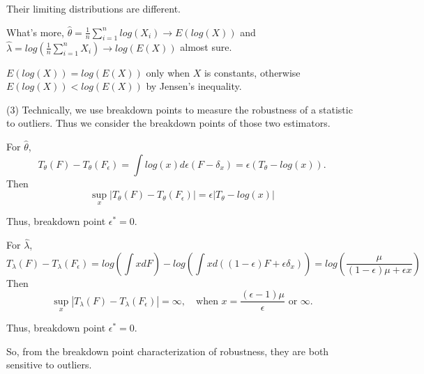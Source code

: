 \begin{solution}
    Their limiting distributions are different.

    What's more, $\hat{\theta}=\frac{1}{n} \sum_{i=1}^n log(X_i) \to E(log(X))$ and $\hat{\lambda} = log\left( \frac{1}{n} \sum_{i=1}^n X_i\right) \to log(E(X))$ almost sure.

    $E(log(X)) = log(E(X))$ only when $X$ is constants, otherwise $E(log(X)) < log(E(X))$ by Jensen's inequality.

    (3) Technically, we use breakdown points to measure the robustness of a statistic to outliers. Thus we consider the breakdown points of those two estimators.
    
    For $\hat{\theta}$, 
    \begin{equation*}
        T_\theta(F) - T_\theta(F_\epsilon) = \int log(x) d \epsilon (F -\delta_x)
        = \epsilon (T_\theta - log(x)).
    \end{equation*}
    Then
    \begin{equation*}
        \sup_x | T_\theta(F) - T_\theta(F_\epsilon) | = \epsilon |T_\theta - log(x)|
    \end{equation*}

    Thus, breakdown point $\epsilon^* = 0$.

    For $\hat{\lambda}$, 
    \begin{equation*}
        T_\lambda(F) - T_\lambda(F_\epsilon) = log \left( \int x d F \right) - log \left( \int x d( (1-\epsilon)F + \epsilon \delta_x)\right)
        = log\left(\frac{\mu}{(1-\epsilon)\mu + \epsilon x}\right)
    \end{equation*}
    Then
    \begin{equation*}
        \sup_x | T_\lambda(F) - T_\lambda(F_\epsilon) | 
        =  \infty,
        \quad \text{when } x = \frac{(\epsilon - 1)\mu}{\epsilon} \text{ or } \infty.
    \end{equation*}

    Thus, breakdown point $\epsilon^* = 0$.

    So, from the breakdown point characterization of robustness, they are both sensitive to outliers. 


\end{solution}

